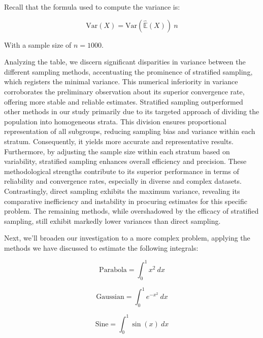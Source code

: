 \documentclass{report}
\begin{document}
Recall that the formula used to compute the variance is:

\begin{equation*} \mathrm{Var}(X) = \mathrm{Var}(\hat{\mathbb{E}}(X)) \ n \end{equation*}

With a sample size of \(n = 1000\).

Analyzing the table, we discern significant disparities in variance between the different sampling methods, accentuating the prominence of stratified sampling, which registers the minimal variance. This numerical inferiority in variance corroborates the preliminary observation about its superior convergence rate, offering more stable and reliable estimates. Stratified sampling outperformed other methods in our study primarily due to its targeted approach of dividing the population into homogeneous strata. This division ensures proportional representation of all subgroups, reducing sampling bias and variance within each stratum. Consequently, it yields more accurate and representative results. Furthermore, by adjusting the sample size within each stratum based on variability, stratified sampling enhances overall efficiency and precision. These methodological strengths contribute to its superior performance in terms of reliability and convergence rates, especially in diverse and complex datasets. Contrastingly, direct sampling exhibits the maximum variance, revealing its comparative inefficiency and instability in procuring estimates for this specific problem. The remaining methods, while overshadowed by the efficacy of stratified sampling, still exhibit markedly lower variances than direct sampling.

Next, we'll broaden our investigation to a more complex problem, applying the methods we have discussed to estimate the following integrals:

\begin{equation} 
	\label{eq:integralvariancereduction1} 
	\text{Parabola} = \int_{0}^{1} x^2 \ dx 
\end{equation}

\begin{equation} 
	\label{eq:integralvariancereduction2} 
	\text{Gaussian} = \int_{0}^{1} e^{-x^2} \ dx
\end{equation}

\begin{equation} 
	\label{eq:integralvariancereduction3} 
	\text{Sine} = \int_{0}^{1} \sin(x) \ dx
\end{equation}
\end{document}
